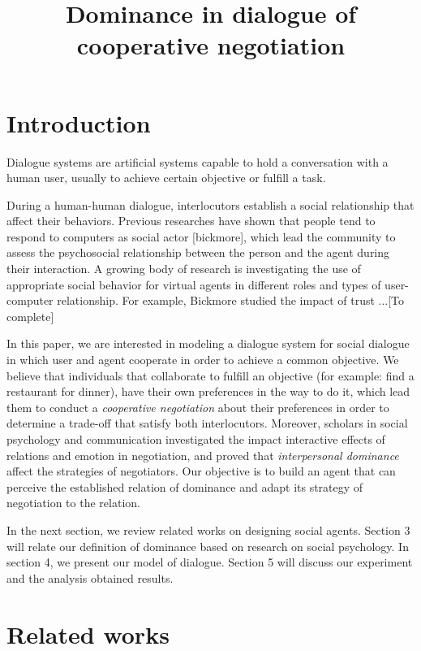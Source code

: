 \documentclass{llncs}
\begin{document}
				\title{\vskip -10pt Dominance in dialogue of cooperative negotiation}
				\maketitle
			\section{Introduction}
			Dialogue systems are artificial systems capable to hold a conversation with a human user, usually to achieve certain objective or fulfill a task.
			
			During a human-human dialogue, interlocutors establish a social relationship that affect their behaviors. Previous researches have shown that people tend to respond to computers as social actor [bickmore], which lead the community to assess the psychosocial relationship between the person and the agent during their interaction. 
			A growing body of research is investigating the use of appropriate social behavior for virtual agents in different roles and types of user-computer relationship.
			For example, Bickmore studied the impact of trust ...[To complete]
			
			
			In this paper, we are interested in modeling a dialogue system for social dialogue in which user and agent cooperate in order to achieve a common objective.  We believe that individuals that collaborate to fulfill an objective (for example: find a restaurant for dinner), have their own preferences in the way to do it, which lead them to conduct a \emph{cooperative negotiation} about their preferences in order to determine a trade-off that satisfy both interlocutors. Moreover, scholars in social psychology and communication investigated the impact interactive effects of relations and emotion in negotiation, and proved that  \emph{interpersonal dominance} affect the strategies of negotiators. Our objective is to build an agent that can perceive the established relation of dominance and adapt its strategy of negotiation to the relation. 
			
			In the next section, we review related works on designing social agents. Section 3 will relate our definition of dominance based on research on social psychology. In section 4, we present our model of dialogue. Section 5 will discuss our experiment and the analysis obtained results. 
			
			\section{Related works}
			
\end{document}
